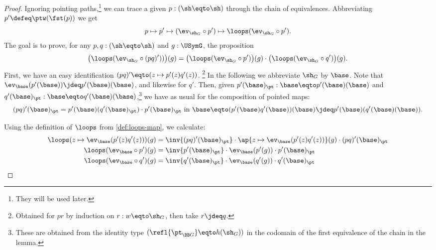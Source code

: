 \begin{proof}
Ignoring pointing paths,\footnote{They will be used later.} 
we can trace a given $p:(\sh\eqto\sh)$ through 
the chain of equivalences. Abbreviating $p' \defeq \ptw(\fst(p))$ we get
\[ 
p \mapsto 
p' \mapsto 
(\ev_{\sh_G}\circ p') \mapsto 
\loops(\ev_{\sh_G}\circ p').
\]
The goal is to prove, for any $p,q:(\sh\eqto\sh)$ and $g:\USymG$, 
the proposition
\[
\bigl(\loops(\ev_{\sh_G}\circ (pq)'))\bigr)(g) = 
\bigl(\loops(\ev_{\sh_G}\circ p')\bigr)(g)\cdot
\bigl(\loops(\ev_{\sh_G}\circ q')\bigr)(g).
\]
First, we have an easy identification $(pq)'\eqto(z\mapsto p'(z)q'(z))$.%
\footnote{Obtained for $pr$ by induction on $r:w\eqto\sh_G$, 
then take $r\jdeq q$.}
In the following we abbreviate $\sh_G$ by $\base$. 
Note that
$\ev_\base(p'(\base))\jdeq p'(\base)(\base)$, and likewise for $q'$.
Then, given $p'(\base)_\pt: \base \eqto p'(\base)(\base)$
and $q'(\base)_\pt : \base \eqto q'(\base)(\base)$,\footnote{\label{ft:ptd-ness}
These are obtained from the identity type $(\refl{\pt_{\BB G}}\eqto h(\sh_G))$
in the codomain of the first equivalence of the chain in the lemma.}
we have as usual for the composition of pointed maps:
\[
(pq)'(\base)_\pt = p'(\base)(q'(\base)_\pt)\cdot p'(\base)_\pt \text{~in~} 
\base \eqto (p'(\base)q'(\base))(\base) \jdeq p'(\base)(q'(\base)(\base)).
\]

Using the definition of $\loops$ from \cref{def:loops-map},
we calculate:
\begin{align*}
\loops(z\mapsto \ev_{\base}(p'(z)q'(z)))(g) &= 
\inv{(pq)'(\base)_\pt}\cdot \ap{z\mapsto \ev_{\base}(p'(z)q'(z))}(g) \cdot {(pq)'(\base)_\pt}\\
\loops(\ev_{\base}\circ p')(g) &= 
\inv{p'(\base)_\pt} \cdot \ev_{\base}(p'(g)) \cdot {p'(\base)_\pt}\\
\loops(\ev_{\base}\circ q')(g) &= 
\inv{q'(\base)_\pt} \cdot \ev_{\base}(q'(g)) \cdot {q'(\base)_\pt}
\end{align*}


\end{proof}
